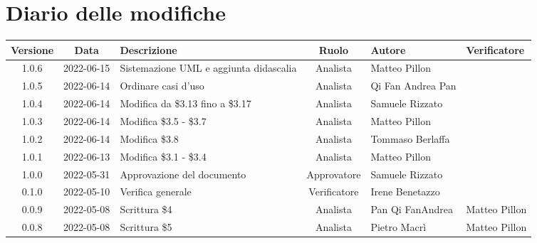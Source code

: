 \section*{Diario delle modifiche}
	\begin{center}
	\renewcommand{\arraystretch}{1.8} %
	\begin{longtable}{ |c|c|p{8em}|c|m{5em}|m{5em}| }
	\hline
	\textbf{Versione} & \textbf{Data} & \textbf{Descrizione} &  \textbf{Ruolo} &  \textbf{Autore} & \textbf{Verificatore}\\ %
	\hline
	1.0.6 & 2022-06-15 & Sistemazione UML \newline e aggiunta didascalia  & Analista & Matteo \newline Pillon & \\
	\hline
	1.0.5 & 2022-06-14 & Ordinare casi d'uso  & Analista & Qi Fan Andrea	\newline Pan & \\
	\hline
	1.0.4 & 2022-06-14 & Modifica da \$3.13 \newline fino a \$3.17 & Analista & Samuele	\newline Rizzato & \\
	\hline
	1.0.3 & 2022-06-14 & Modifica \newline \$3.5 - \$3.7 & Analista & Matteo	\newline Pillon & \\
  	\hline
	1.0.2 & 2022-06-14 & Modifica \newline \$3.8 & Analista & Tommaso	\newline Berlaffa & \\
  	\hline
	1.0.1 & 2022-06-13 & Modifica \newline \$3.1 - \$3.4 & Analista & Matteo	\newline Pillon & \\
	\hline
	1.0.0 & 2022-05-31 & Approvazione del documento & Approvatore & Samuele \newline Rizzato & \\
	\hline
	0.1.0 & 2022-05-10 & Verifica generale & Verificatore & Irene \newline Benetazzo & \\
	\hline
    0.0.9 & 2022-05-08 & Scrittura \$4 & Analista & Pan Qi Fan\newline Andrea & Matteo \newline Pillon\\
	\hline
    0.0.8 & 2022-05-08 & Scrittura \$5 & Analista & Pietro \newline Macrì & Matteo \newline Pillon\\

\end{longtable}
\end{center}
